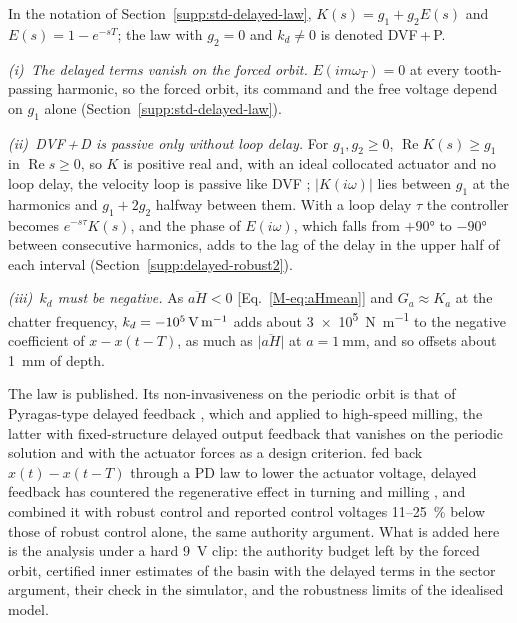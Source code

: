 In the notation of Section~\ref{supp:std-delayed-law}, $K(s)=g_1+g_2E(s)$ and $E(s)=1-e^{-sT}$; the law with $g_2=0$ and $k_d\neq0$ is denoted DVF\,+\,P.

\emph{(i)~The delayed terms vanish on the forced orbit.} $E(im\omega_T)=0$ at every tooth-passing harmonic, so the forced orbit, its command and the free voltage depend on $g_1$ alone (Section~\ref{supp:std-delayed-law}).

\emph{(ii)~DVF\,+\,D is passive only without loop delay.} For $g_1,g_2\ge0$, $\operatorname{Re}K(s)\ge g_1$ in $\operatorname{Re}s\ge0$, so $K$ is positive real and, with an ideal collocated actuator and no loop delay, the velocity loop is passive like DVF \citep{elliott2001feedback}; $\lvert K(i\omega)\rvert$ lies between $g_1$ at the harmonics and $g_1+2g_2$ halfway between them. With a loop delay $\tau$ the controller becomes $e^{-s\tau}K(s)$, and the phase of $E(i\omega)$, which falls from $+\ang{90}$ to $-\ang{90}$ between consecutive harmonics, adds to the lag of the delay in the upper half of each interval (Section~\ref{supp:delayed-robust2}).

\emph{(iii)~$k_d$ must be negative.} As $\overline{aH}<0$ [Eq.~\eqref{M-eq:aHmean}] and $G_a\approx K_a$ at the chatter frequency, $k_d=\SI{-e5}{\volt\per\metre}$ adds about \SI{3e5}{\newton\per\metre} to the negative coefficient of $x-x(t-T)$, as much as $\lvert\overline{aH}\rvert$ at $a=\SI{1}{\milli\metre}$, and so offsets about \SI{1}{\milli\metre} of depth.

The law is published. Its non-invasiveness on the periodic orbit is that of Pyragas-type delayed feedback \citep{pyragas1992continuous}, which \citet{vandewouw2015ifac} and \citet{vandijk2015ijrnc} applied to high-speed milling, the latter with fixed-structure delayed output feedback that vanishes on the periodic solution and with the actuator forces as a design criterion. \citet{li2022ijamt} fed back $x(t)-x(t-T)$ through a PD law to lower the actuator voltage, delayed feedback has countered the regenerative effect in turning \citep{mancisidor2019mechatronics} and milling \citep{du2022time}, and \citet{du2024ijms} combined it with robust control and reported control voltages 11--\SI{25}{\percent} below those of robust control alone, the same authority argument. What is added here is the analysis under a hard \SI{9}{\volt} clip: the authority budget left by the forced orbit, certified inner estimates of the basin with the delayed terms in the sector argument, their check in the simulator, and the robustness limits of the idealised model.

